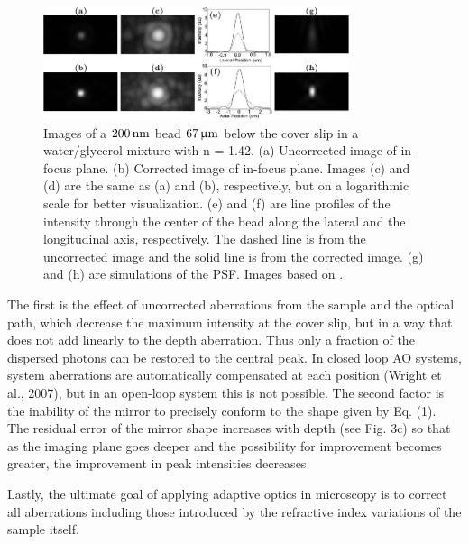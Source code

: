 \begin{figure}[htb]
	\centering
		\includegraphics[width=0.80\textwidth]{images/wide_flour_spher_All.jpg}
	\caption{Images of a $\unit[200]{nm}$ bead $\unit[67]{\upmu m}$ below the 
cover slip in a water/glycerol mixture with n = 1.42.  (a) Uncorrected image 
of in-focus plane. (b) Corrected image of in-focus plane. Images (c) and (d) 
are the same as (a) and (b), respectively, but on a logarithmic scale for 
better visualization. (e) and (f) are line profiles of the intensity through 
the center of the bead along the lateral and the longitudinal axis, 
respectively. The dashed line is from the uncorrected image and the solid 
line is from the corrected image. (g) and (h) are simulations of the PSF. 
Images based on \cite{wide_AOM_FM_spehrical_correction}.}
	\label{fig:wide_flour_spher_All} 
\end{figure}


The first is the effect of uncorrected aberrations from the sample and the 
optical path, which decrease the maximum intensity at the cover slip, but in 
a way that does not add linearly to the depth aberration. Thus only a 
fraction of the dispersed photons can be restored to the central peak. In 
closed loop AO systems, system aberrations are automatically compensated at 
each position (Wright et al., 2007), but in an open-loop system this is not 
possible. The second factor is the inability of the mirror to precisely 
conform to the shape given by Eq. (1). The residual error of the mirror shape 
increases with depth (see Fig. 3c) so that as the imaging plane goes deeper 
and the possibility for improvement becomes greater, the improvement in peak 
intensities decreases

Lastly, the ultimate goal of applying adaptive optics in microscopy is to 
correct all aberrations including those introduced by the refractive index 
variations of the sample itself.


\cite{wide_AOM_FM_spehrical_correction}

\cite{wide_MPFM}
\cite{wide_AOM_structured_illu}
\cite{wide_AOM_loew_freq}


